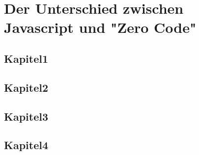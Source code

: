 \chapter{Der Unterschied zwischen Javascript und "Zero Code"}
\section{Kapitel1}
\section{Kapitel2}
\section{Kapitel3}
\section{Kapitel4}